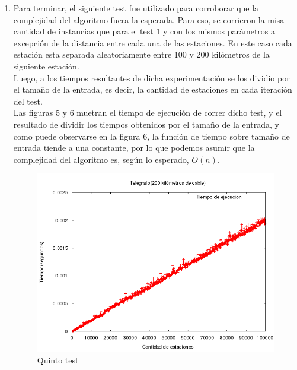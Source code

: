 \documentclass[10pt, a4paper]{article}
\begin{document}
\begin{enumerate}
	\item Para terminar, el siguiente test fue utilizado para corroborar que la complejidad del algoritmo fuera la esperada. Para eso, se corrieron la misa cantidad de instancias que para el test 1 y con los mismos par\'ametros a excepci\'on de la distancia entre cada una de las estaciones. En este caso cada estaci\'on esta separada aleatoriamente entre 100 y 200 kil\'ometros de la siguiente estaci\'on.\\
	Luego, a los tiempos resultantes de dicha experimentaci\'on se los dividio por el tama\~no de la entrada, es decir, la cantidad de estaciones en cada iteraci\'on del test. \\
	Las figuras 5 y 6 muetran el tiempo de ejecuci\'on de correr dicho test, y el resultado de dividir los tiempos obtenidos por el tama\~no de la entrada, y como puede observarse en la figura 6, la funci\'on de tiempo sobre tama\~no de entrada tiende a una constante, por lo que podemos asumir que la complejidad del algoritmo es, seg\'un lo esperado, $O(n)$.\\
	\begin{figure}[H]
  		\centering
   	 	\includegraphics[width=1\textwidth]
   	 	{Imagenes/telegrafoTiempos4.png}
		\caption{Quinto test}
	\end{figure}
	

\end{enumerate}
\end{document}
